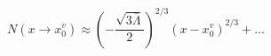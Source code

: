 \begin{equation}
N(x\rightarrow x^v_0)\approx(-\frac{\sqrt{3\bar\Lambda}}{2})^{2/3} (x-x^v_0)^{2/3}+...
\end{equation}

